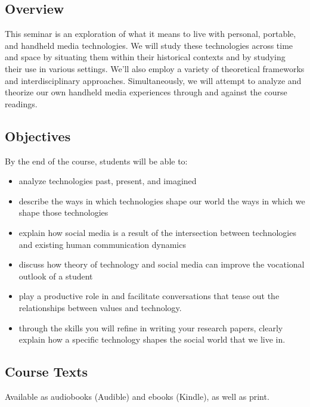 \documentclass[
  letterpaper,
  DIV=11,
  numbers=noendperiod,
  oneside]{scrartcl}
\providecommand{\tightlist}{%
  \setlength{\itemsep}{0pt}\setlength{\parskip}{0pt}}\usepackage{longtable,booktabs,array}
\begin{document}
\begin{figure}
\end{figure}%

\subsection{Overview}\label{overview}

This seminar is an exploration of what it means to live with personal,
portable, and handheld media technologies. We will study these
technologies across time and space by situating them within their
historical contexts and by studying their use in various settings. We'll
also employ a variety of theoretical frameworks and interdisciplinary
approaches. Simultaneously, we will attempt to analyze and theorize our
own handheld media experiences through and against the course readings.

\subsection{Objectives}\label{objectives}

By the end of the course, students will be able to:

\begin{itemize}
\tightlist
\item
  analyze technologies past, present, and imagined
\item
  describe the ways in which technologies shape our world the ways in
  which we shape those technologies
\item
  explain how social media is a result of the intersection between
  technologies and existing human communication dynamics
\item
  discuss how theory of technology and social media can improve the
  vocational outlook of a student
\item
  play a productive role in and facilitate conversations that tease out
  the relationships between values and technology.
\item
  through the skills you will refine in writing your research papers,
  clearly explain how a specific technology shapes the social world that
  we live in.
\end{itemize}

\subsection{Course Texts}\label{course-texts}

Available as audiobooks (Audible) and ebooks (Kindle), as well as print.
\end{document}
